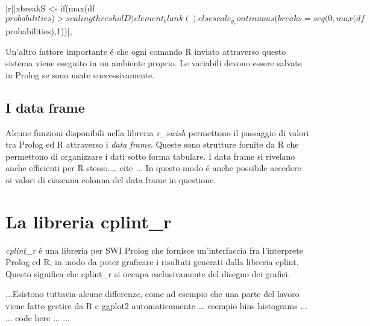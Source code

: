 \documentclass[10pt,titlepage,twoside,a4paper]{report}
\newenvironment{code}{\singlespacing\captionsetup{type=listing}}{}
\begin{document}
\begin{code}
    \caption{Esempio di quasi quotation tratto da cplint\_r}
    \begin{rcode*}{}
{|r||xbreakS <- if(max(df$probabilities) > scalingthresholD) element_blank() else scale_y_continuous(breaks=seq(0,max(df$probabilities),1))|},
    \end{rcode*}
\end{code}

Un'altro fattore importante \'e che ogni comando R inviato attraverso questo 
sistema viene eseguito in un ambiente proprio. Le variabili devono essere 
salvate in Prolog se sono usate successivamente.

\section{I data frame}
Alcune funzioni disponibili nella libreria \emph{r\_swish} permettono il 
passaggio di valori tra Prolog ed R attraverso i \emph{data frame}. Queste sono 
strutture fornite da R che permettono di organizzare i dati sotto forma 
tabulare. I data frame si rivelano anche efficienti per R stesso.... cite ... 
In questo modo \'e anche possibile accedere ai valori di ciascuna colonna del 
data frame in questione.




\chapter{La libreria cplint\_r} \label{la-libreria-cplint-r}
\emph{cplint\_r} \'e una libreria per SWI Prolog che fornisce un'interfaccia 
fra l'interprete Prolog ed R, in modo da poter graficare i risultati generati 
dalla libreria cplint. Questo significa che cplint\_r si occupa esclusivamente 
del disegno dei grafici.

...Esistono tuttavia alcune differenze, come ad esempio che una 
parte del lavoro viene fatto gestire da R e ggplot2 automaticamente ... esempio 
bins histograms ... ... code here ...
...
\end{document}
